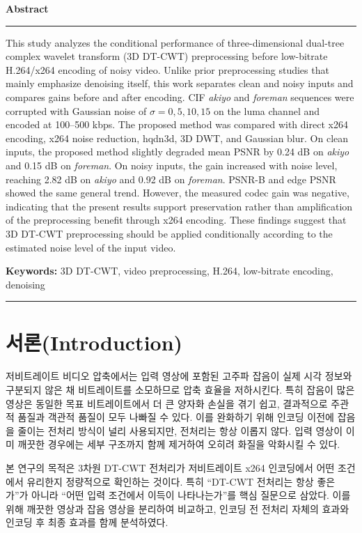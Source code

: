\documentclass[10pt]{article}
\begin{document}
\begin{center}
{\large \bf Abstract}
\noindent\rule{\textwidth}{0.4pt}
\begin{flushleft}
This study analyzes the conditional performance of three-dimensional dual-tree complex wavelet transform (3D DT-CWT) preprocessing before low-bitrate H.264/x264 encoding of noisy video. Unlike prior preprocessing studies that mainly emphasize denoising itself, this work separates clean and noisy inputs and compares gains before and after encoding. CIF \textit{akiyo} and \textit{foreman} sequences were corrupted with Gaussian noise of $\sigma=0,5,10,15$ on the luma channel and encoded at 100--500 kbps. The proposed method was compared with direct x264 encoding, x264 noise reduction, hqdn3d, 3D DWT, and Gaussian blur. On clean inputs, the proposed method slightly degraded mean PSNR by 0.24 dB on \textit{akiyo} and 0.15 dB on \textit{foreman}. On noisy inputs, the gain increased with noise level, reaching 2.82 dB on \textit{akiyo} and 0.92 dB on \textit{foreman}. PSNR-B and edge PSNR showed the same general trend. However, the measured codec gain was negative, indicating that the present results support preservation rather than amplification of the preprocessing benefit through x264 encoding. These findings suggest that 3D DT-CWT preprocessing should be applied conditionally according to the estimated noise level of the input video.

\textbf{Keywords:} 3D DT-CWT, video preprocessing, H.264, low-bitrate encoding, denoising
\noindent\rule{\textwidth}{0.4pt}
\end{flushleft}
\end{center}

\section{\large \bf 서론(Introduction)}
저비트레이트 비디오 압축에서는 입력 영상에 포함된 고주파 잡음이 실제 시각 정보와 구분되지 않은 채 비트레이트를 소모하므로 압축 효율을 저하시킨다. 특히 잡음이 많은 영상은 동일한 목표 비트레이트에서 더 큰 양자화 손실을 겪기 쉽고, 결과적으로 주관적 품질과 객관적 품질이 모두 나빠질 수 있다. 이를 완화하기 위해 인코딩 이전에 잡음을 줄이는 전처리 방식이 널리 사용되지만, 전처리는 항상 이롭지 않다. 입력 영상이 이미 깨끗한 경우에는 세부 구조까지 함께 제거하여 오히려 화질을 악화시킬 수 있다.

본 연구의 목적은 3차원 DT-CWT 전처리가 저비트레이트 x264 인코딩에서 어떤 조건에서 유리한지 정량적으로 확인하는 것이다. 특히 ``DT-CWT 전처리는 항상 좋은가''가 아니라 ``어떤 입력 조건에서 이득이 나타나는가''를 핵심 질문으로 삼았다. 이를 위해 깨끗한 영상과 잡음 영상을 분리하여 비교하고, 인코딩 전 전처리 자체의 효과와 인코딩 후 최종 효과를 함께 분석하였다.
\end{document}
